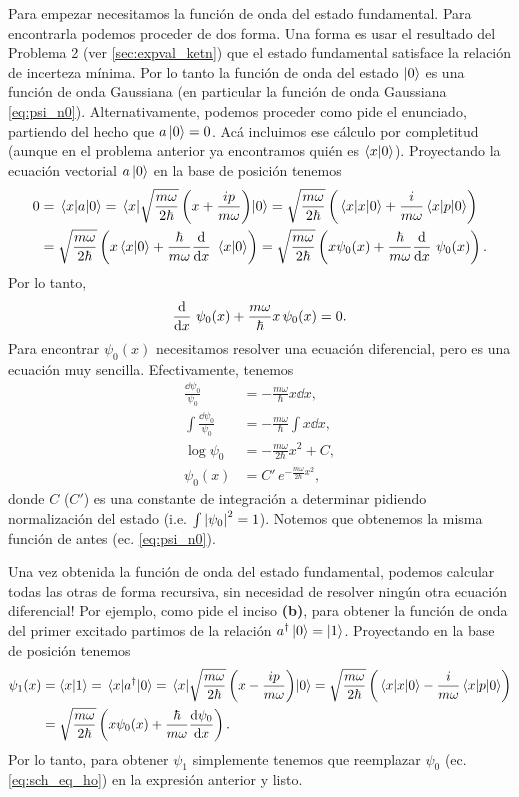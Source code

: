 \documentclass[10pt, a4paper]{article}
\newcommand{\aprefactsq}{\frac{m\omega}{2\hbar}}
\newcommand{\aprefact}{\sqrt{\aprefactsq}}
\numberwithin{equation}{subsection}
\begin{document}
\bigbreak

Para empezar necesitamos la función de onda del estado fundamental. Para
encontrarla podemos proceder de dos forma. Una forma es usar el resultado del
Problema 2 (ver \ref{sec:expval_ketn}) que el estado fundamental satisface la
relación de incerteza mínima. Por lo tanto la función de onda del estado
$\ket{0}$ es una función de onda Gaussiana (en particular la función de onda
Gaussiana \eqref{eq:psi_n0}). Alternativamente, podemos proceder como pide el
enunciado, partiendo del hecho que $a\ket{0} = 0$. Acá incluimos ese cálculo
por completitud (aunque en el problema anterior ya encontramos quién es
$\braket{x}{0}$). Proyectando la ecuación vectorial $a\ket{0}$ en la base de
posición tenemos
\begin{align}
  0 &= \matrixel{x}{a}{0} = \matrixel{x}{\aprefact\left(x +
    \frac{ip}{m\omega}\right)}{0} = \aprefact\left(\matrixel{x}{x}{0} +
    \frac{i}{m\omega}\matrixel{x}{p}{0}\right) \nonumber \\
  &= \aprefact\left(x\braket{x}{0} + \frac{\hbar}{m\omega}\dv{x}\
    \braket{x}{0}\right) = \aprefact\left(x\psi_{0}(x) +
    \frac{\hbar}{m\omega}\dv{x}\ \psi_{0}(x)\right).
\end{align}
Por lo tanto,
\begin{equation}
  \dv{x}\ \psi_{0}(x) + \frac{m\omega}{\hbar} x\,\psi_{0}(x) = 0.
\end{equation}
Para encontrar $\psi_{0}(x)$ necesitamos resolver una ecuación diferencial,
pero es una ecuación muy sencilla. Efectivamente, tenemos
\begin{align}
  \frac{\dd{\psi_0}}{\psi_0} &= -\frac{m\omega}{\hbar}x\dd{x}, \\
  \int\frac{\dd{\psi_0}}{\psi_0} &= -\frac{m\omega}{\hbar}\int x\dd{x}, \\
  \log\psi_0 &= -\frac{m\omega}{2\hbar}x^2 + C, \\
  \psi_0(x) &= C'\,e^{-\frac{m\omega}{2\hbar}x^2},
\end{align}
donde $C$ ($C'$) es una constante de integración a determinar pidiendo
normalización del estado (i.e. $\int\abs{\psi_0}^2 = 1$). Notemos que obtenemos
la misma función de antes (ec.  \eqref{eq:psi_n0}).

\bigbreak

Una vez obtenida la función de onda del estado fundamental, podemos calcular
todas las otras de forma recursiva, sin necesidad de resolver ningún otra
ecuación diferencial! Por ejemplo, como pide el inciso \textbf{(b)}, para
obtener la función de onda del primer excitado partimos de la relación
$a^\dagger\ket{0} = \ket{1}$. Proyectando en la base de posición tenemos
\begin{align}
  \psi_{1}(x) &= \braket{x}{1} = \matrixel{x}{a^\dagger}{0} =
    \matrixel{x}{\aprefact\left(x - \frac{ip}{m\omega}\right)}{0} =
    \aprefact\left(\matrixel{x}{x}{0} -
    \frac{i}{m\omega}\matrixel{x}{p}{0}\right) \nonumber \\
  &= \aprefact\left(x\psi_{0}(x) + \frac{\hbar}{m\omega}\dv{\psi_0}{x}\right).
\end{align}
Por lo tanto, para obtener $\psi_1$ simplemente tenemos que reemplazar $\psi_0$
(ec. \eqref{eq:sch_eq_ho}) en la expresión anterior y listo.
\end{document}

